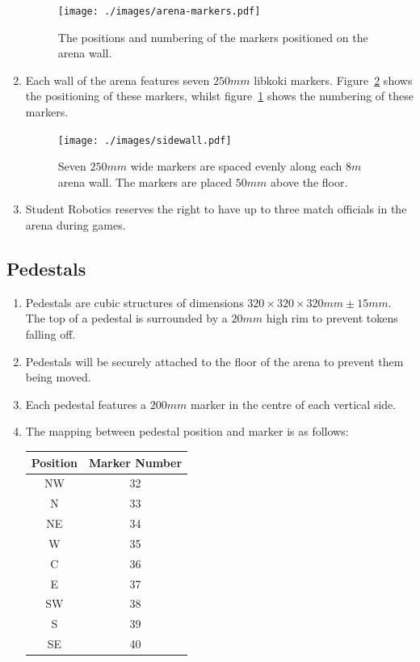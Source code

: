 \begin{enumerate}
  \begin{figure}
    \centering
    \texttt{[image: ./images/arena-markers.pdf]}
    \caption{The positions and numbering of the markers positioned on the arena wall.}
    \label{fig:arena-zones}
  \end{figure}

\item Each wall of the arena features seven $250mm$ libkoki markers.
      Figure~\ref{fig:arena-wall} shows the positioning of these markers, whilst figure~\ref{fig:arena-zones} shows the numbering of these markers.

  \begin{figure}
    \centering
    \texttt{[image: ./images/sidewall.pdf]}
    \caption{Seven $250mm$ wide markers are spaced evenly along each $8m$ arena wall.
             The markers are placed $50mm$ above the floor.}
    \label{fig:arena-wall}
  \end{figure}

\item Student Robotics reserves the right to have up to three match officials in the arena during games.

\end{enumerate}

\subsection{Pedestals}
\label{sub:pedestals}
\begin{enumerate}
\item Pedestals are cubic structures of dimensions $320 \times 320 \times 320mm \pm 15mm$.
      The top of a pedestal is surrounded by a $20mm$ high rim to prevent tokens falling off.

\item Pedestals will be securely attached to the floor of the arena to prevent them being moved.

\item Each pedestal features a $200mm$ marker in the centre of each vertical side.

\item The mapping between pedestal position and marker is as follows:

\begin{center}
  \begin{tabular}{cc}
    \toprule
    \textbf{Position} & \textbf{Marker Number} \\
    \midrule
    NW & 32 \\
    N  & 33 \\
    NE & 34 \\
    W  & 35 \\
    C  & 36 \\
    E  & 37 \\
    SW & 38 \\
    S  & 39 \\
    SE & 40 \\
    \bottomrule
  \end{tabular}
\end{center}

\end{enumerate}

